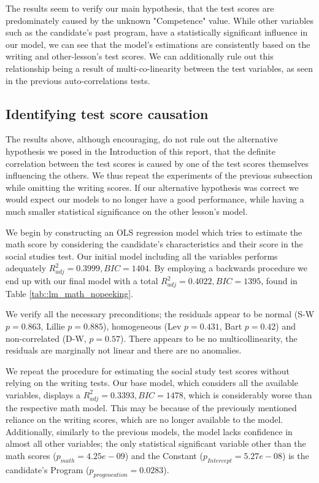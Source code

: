 \documentclass[10pt, a4paper]{article}
\begin{document}
	The results seem to verify our main hypothesis, that the test scores are predominately caused by the unknown "Competence" value. While other variables such as the candidate's past program, have a statistically significant influence in our model, we can see that the model's estimations are consistently based on the writing and other-lesson's test scores. We can additionally rule out this relationship being a result of multi-co-linearity between the test variables, as seen in the previous auto-correlations tests.
	\unskip
	\subsection{Identifying test score causation}
	
	The results above, although encouraging, do not rule out the alternative hypothesis we posed in the Introduction of this report, that the definite correlation between the test scores is caused by one of the test scores themselves influencing the others. We thus repeat the experiments of the previous subsection while omitting the writing scores. If our alternative hypothesis was correct we would expect our models to no longer have a good performance, while having a much smaller statistical significance on the other lesson's model.
	
	We begin by constructing an OLS regression model which tries to estimate the math score by considering the candidate's characteristics and their score in the social studies test. Our initial model including all the variables performs adequately $R^2_{adj} = 0.3999, BIC=1404$. By employing a backwards procedure we end up with our final model with a total $R^2_{adj} = 0.4022, BIC=1395$, found in Table \ref{tab::lm_math_nopeeking}.
	
	We verify all the necessary preconditions; the residuals appear to be normal (S-W $p = 0.863$, Lillie $p=0.885$), homogeneous (Lev $p = 0.431$, Bart $p = 0.42$) and non-correlated (D-W, $p=0.57$). There appears to be no multicollinearity, the residuals are marginally not linear and there are no anomalies.
	
	We repeat the procedure for estimating the social study test scores without relying on the writing tests. Our base model, which considers all the available variables, displays a $R^2_{adj} = 0.3393, BIC=1478$, which is considerably worse than the respective math model. This may be because of the previously mentioned reliance on the writing scores, which are no longer available to the model. Additionally, similarly to the previous models, the model lacks confidence in almost all other variables; the only statistical significant variable other than the math scores ($p_{math} = 4.25e-09$) and the Constant ($p_{Intercept} = 5.27e-08$) is the candidate's Program ($p_{progvocation} = 0.0283$).
	
\end{document}
